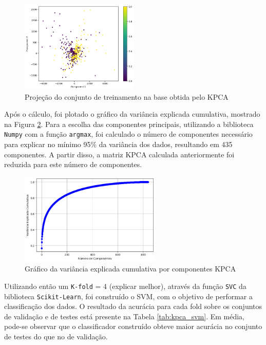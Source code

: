 \documentclass[]{abntex2}
\begin{document}
\begin{figure}[H]
    \centering 
    \includegraphics[width=0.5\textwidth]{imgs/ex1/KPCA.png}
    \caption{Projeção do conjunto de treinamento na base obtida pelo KPCA}
    \label{fig:KPCA} %
\end{figure}

Após o cálculo, foi plotado o gráfico da {\color{red}variância explicada cumulativa}, mostrado na Figura \ref{fig:vari_kpca}. Para a escolha das componentes principais, utilizando a biblioteca \texttt{Numpy} com a função \texttt{argmax}, foi calculado o número de componentes necessário para explicar no mínimo 95\% da variância dos dados, resultando em 435 componentes. A partir disso, a matriz KPCA calculada anteriormente foi reduzida para este número de componentes.

\begin{figure}[H]
    \centering 
    \includegraphics[width=0.6\textwidth]{imgs/ex1/vari_kpca.png}
    \caption{Gráfico da variância explicada cumulativa por componentes KPCA}
    \label{fig:vari_kpca} %
\end{figure}

Utilizando então um \texttt{K-fold} = 4 {\color{red}(explicar melhor)}, através da função \texttt{SVC} da biblioteca \texttt{Scikit-Learn}, foi construído o SVM, com o objetivo de performar a classificação dos dados. O resultado da acurácia para cada fold sobre os conjuntos de validação e de testes está presente na Tabela \ref{tab:kpca_svm}. Em média, pode-se observar que o classificador construído obteve maior acurácia no conjunto de testes do que no de validação.
\end{document}
